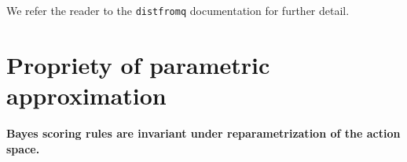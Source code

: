 \documentclass{article}
\begin{document}
We refer the reader to the \verb`distfromq` documentation for further detail.



\section{Propriety of parametric approximation} %
\label{sec:propriety_of_parametric_approximation}

\textbf{Bayes scoring rules are invariant under reparametrization of the action space.}
\end{document}
